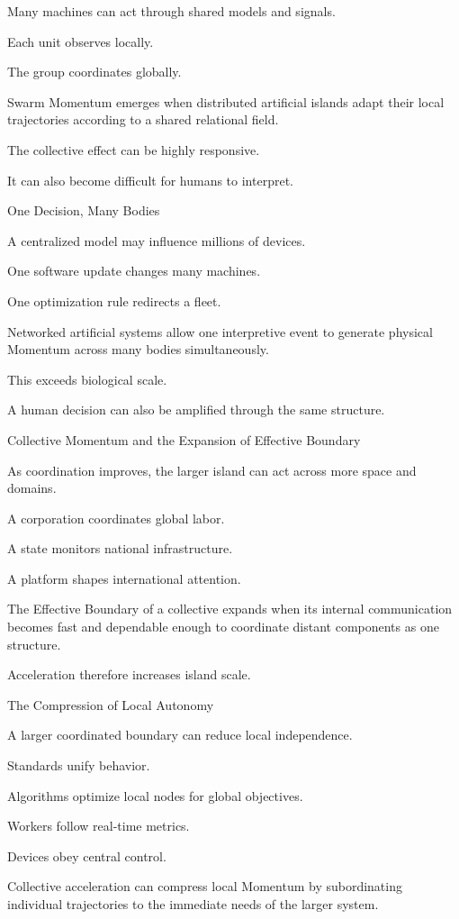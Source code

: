 Many machines can act through shared models and signals.

Each unit observes locally.

The group coordinates globally.

Swarm Momentum emerges when distributed artificial islands adapt their local trajectories according to a shared relational field.

The collective effect can be highly responsive.

It can also become difficult for humans to interpret.

One Decision, Many Bodies

A centralized model may influence millions of devices.

One software update changes many machines.

One optimization rule redirects a fleet.

Networked artificial systems allow one interpretive event to generate physical Momentum across many bodies simultaneously.

This exceeds biological scale.

A human decision can also be amplified through the same structure.

Collective Momentum and the Expansion of Effective Boundary

As coordination improves, the larger island can act across more space and domains.

A corporation coordinates global labor.

A state monitors national infrastructure.

A platform shapes international attention.

The Effective Boundary of a collective expands when its internal communication becomes fast and dependable enough to coordinate distant components as one structure.

Acceleration therefore increases island scale.

The Compression of Local Autonomy

A larger coordinated boundary can reduce local independence.

Standards unify behavior.

Algorithms optimize local nodes for global objectives.

Workers follow real-time metrics.

Devices obey central control.

Collective acceleration can compress local Momentum by subordinating individual trajectories to the immediate needs of the larger system.

